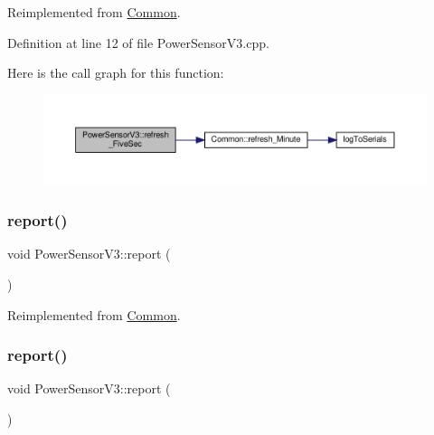Reimplemented from \hyperlink{class_common_a604ab36b3a1d9a5bcfcb225149c82f90}{Common}.



Definition at line 12 of file Power\+Sensor\+V3.\+cpp.

Here is the call graph for this function\+:
\nopagebreak
\begin{figure}[H]
\begin{center}
\leavevmode
\includegraphics[width=350pt]{class_power_sensor_v3_a1bf23a2cfa924933a5e265dc3a337ec4_cgraph}
\end{center}
\end{figure}
\mbox{\label{class_power_sensor_v3_ab86f05622f809b34c4af5587024377d1}} 
\subsubsection{\texorpdfstring{report()}{report()}\hspace{0.1cm}{\footnotesize\ttfamily [1/2]}}
{\footnotesize\ttfamily void Power\+Sensor\+V3\+::report (\begin{DoxyParamCaption}{ }\end{DoxyParamCaption})\hspace{0.3cm}{\ttfamily [virtual]}}



Reimplemented from \hyperlink{class_common_a9e60e2c26a5f4d72342a59a969954636}{Common}.

\mbox{\label{class_power_sensor_v3_ab86f05622f809b34c4af5587024377d1}} 
\subsubsection{\texorpdfstring{report()}{report()}\hspace{0.1cm}{\footnotesize\ttfamily [2/2]}}
{\footnotesize\ttfamily void Power\+Sensor\+V3\+::report (\begin{DoxyParamCaption}{ }\end{DoxyParamCaption})\hspace{0.3cm}{\ttfamily [virtual]}}



